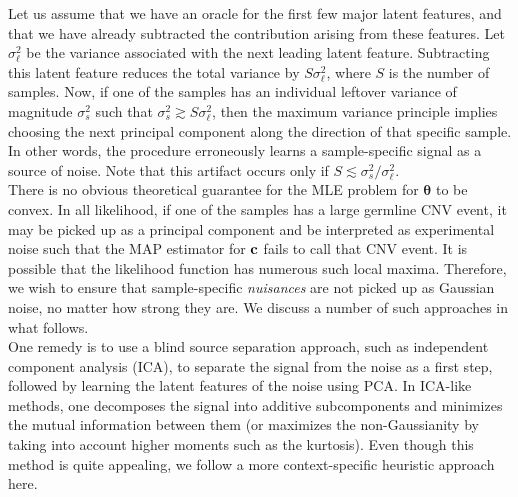 \documentclass[nofootinbib,amssymb,amsmath]{revtex4}
\newcommand{\vc}{{\bf c}}
\newcommand{\vtheta}{{\boldsymbol \theta}}
\begin{document}
Let us assume that we have an oracle for the first few major latent features, and that we have already subtracted the contribution arising from these features. Let $\sigma_\ell^2$ be the variance associated with the next leading latent feature. Subtracting this latent feature reduces the total variance by $S\sigma_\ell^2$, where $S$ is the number of samples. Now, if one of the samples has an individual leftover variance of magnitude $\sigma_s^2$ such that $\sigma_s^2 \gtrsim S\sigma_\ell^2$, then the maximum variance principle implies choosing the next principal component along the direction of that specific sample. In other words, the procedure erroneously learns a sample-specific signal as a source of noise. Note that this artifact occurs only if $S \lesssim \sigma_s^2 / \sigma_\ell^2$.\\

 There is no obvious theoretical guarantee for the MLE problem for $\vtheta$ to be convex. In all likelihood, if one of the samples has a large germline CNV event, it may be picked up as a principal component and be interpreted as experimental noise such that the MAP estimator for $\vc$ fails to call that CNV event. It is possible that the likelihood function has numerous such local maxima. Therefore, we wish to ensure that sample-specific {\em nuisances} are not picked up as Gaussian noise, no matter how strong they are. We discuss a number of such approaches in what follows.\\

 One remedy is to use a blind source separation approach, such as independent component analysis (ICA), to separate the signal from the noise as a first step, followed by learning the latent features of the noise using PCA. In ICA-like methods, one decomposes the signal into additive subcomponents and minimizes the mutual information between them (or maximizes the non-Gaussianity by taking into account higher moments such as the kurtosis). Even though this method is quite appealing, we follow a more context-specific heuristic approach here.\\
\end{document}
